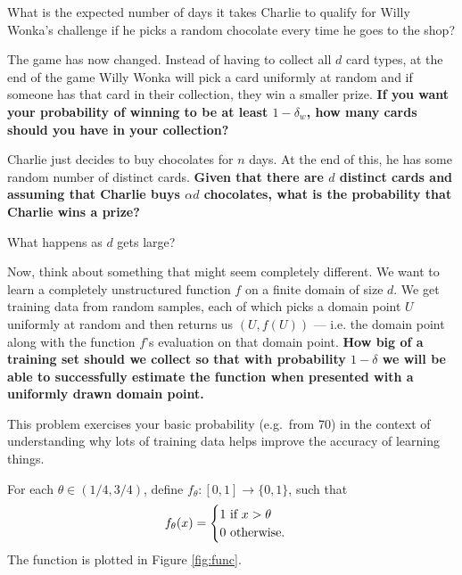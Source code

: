 \documentclass[11pt]{article}
\begin{document}
\begin{Parts}

\Part What is the expected number of days it takes Charlie to qualify for Willy Wonka's challenge if he picks a random chocolate every time he goes to the shop?







\Part The game has now changed. Instead of having to collect all $d$
card types, at the end of the game Willy Wonka will pick a card
uniformly at random and if someone has that card in their collection,
they win a smaller prize. {\bf If you want your probability of winning to
be at least $1-\delta_w$, how many cards should you have in your
collection? }



\Part       Charlie just decides to buy chocolates for $n$ days. At the end of this, he has some random
number of distinct cards. {\bf Given that there are $d$ distinct cards and
assuming that Charlie buys $\alpha d$ chocolates, what is the
probability that Charlie wins a prize? }



\Part What happens as $d$ gets large? 



\Part Now, think about something that might seem completely
different. We want to learn a completely unstructured function $f$ on
a finite domain of size $d$. We get training data from random samples,
each of which picks a  domain point $U$ uniformly at random and then
returns us $(U, f(U))$ --- i.e. the domain point along with the function
$f$'s evaluation on that domain point. {\bf How big of a training set should we collect 
so that with probability $1-\delta$ we will be able to successfully
estimate the function when presented with a uniformly drawn domain
point. }




\end{Parts}



This problem exercises your basic probability (e.g.~from 70) in the
context of understanding why lots of training data helps improve the
accuracy of learning things.

For each $\theta \in (1/4,3/4)$, define $f_{\theta}: [0,1] \to \{0, 1\}$, such that
\begin{align}
f_\theta(x) =
\begin{cases}
1 \text{ if } x > \theta \notag\\
0 \text{ otherwise.} \label{eq:func}
\end{cases}
\end{align}
The function is plotted in Figure \ref{fig:func}.
\end{document}
